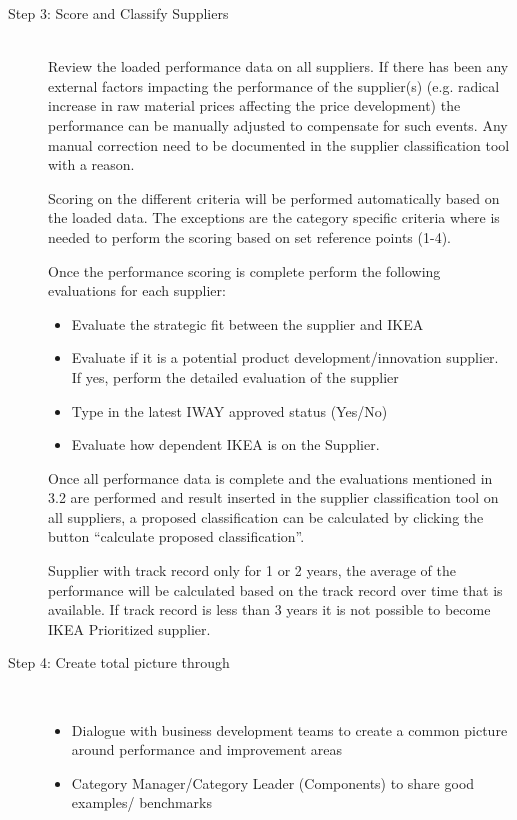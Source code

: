 \documentclass[oneside,12pt]{article}%
\begin{document}
\begin{description}
  \item[Step 3: Score and Classify Suppliers] \hfill \\
  Review the loaded performance data on all suppliers. If there has been any external factors impacting the performance of the supplier(s) (e.g. radical increase in raw material prices affecting the price development) the performance can be manually adjusted to compensate for such events. Any manual correction need to be documented in the supplier classification tool with a reason. \par
  Scoring on the different criteria will be performed automatically based on the loaded data. The exceptions are the category specific criteria where is needed to perform the scoring based on set reference points (1-4). \par
  Once the performance scoring is complete perform the following evaluations for each supplier:
  \begin{itemize}
    \item Evaluate the strategic fit between the supplier and IKEA
    \item Evaluate if it is a potential product development/innovation supplier. If yes, perform the detailed evaluation of the supplier
    \item Type in the latest IWAY approved status (Yes/No)
    \item Evaluate how dependent IKEA is on the Supplier.
  \end{itemize}

  Once all performance data is complete and the evaluations mentioned in 3.2 are performed and result inserted in the supplier classification tool on all suppliers, a proposed classification can be calculated by clicking the button ``calculate proposed classification''. \par
  Supplier with track record only for 1 or 2 years, the average of the performance will be calculated based on the track record over time that is available. If track record is less than 3 years it is not possible to become IKEA Prioritized supplier.

  \item[Step 4: Create total picture through] \hfill \\
  \begin{itemize}
    \item Dialogue with business development teams to create a common picture around performance and improvement areas
    \item Category Manager/Category Leader (Components) to share good examples/ benchmarks
  \end{itemize}


\end{description}
\end{document}
